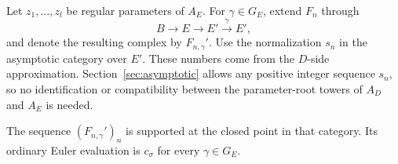 Let $z_1,\ldots,z_l$ be regular parameters of $A_E$.  For
$\gamma\in G_E$, extend $F_n$ through
\[
 B\longrightarrow E\longrightarrow E'
                  \xrightarrow{\gamma}E',
\]
and denote the resulting complex by $F_{n,\gamma}'$.
Use the normalization $s_n$ in the asymptotic category over $E'$.
These numbers come from the $D$-side approximation. Section~\ref{sec:asymptotic}
allows any positive integer sequence $s_n$, so no identification or
compatibility between the parameter-root towers of $A_D$ and $A_E$
is needed.

\begin{lemma}\label{pos:supported-truncation}
The sequence $(F_{n,\gamma}')_n$ is supported at the closed point
in that category.  Its ordinary Euler evaluation is $c_\sigma$
for every $\gamma\in G_E$.
\end{lemma}

